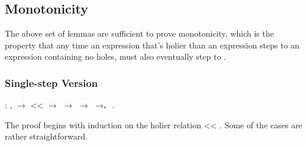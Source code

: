 \documentclass[12pt]{report}
\begin{document}
\subsection{Monotonicity}



The above set of lemmas are sufficient to prove monotonicity, which
is the property that any time an expression  that's
holier than an expression  steps to an expression
 containing no holes,  must also
eventually step to . 

\subsubsection{Single-step Version}

\begin{coqdoccode}
\coqdocemptyline
\coqdocindent{1.00em}
  : \coqdockw{\ensuremath{\forall}}   ,\coqdoceol
\coqdocindent{2.00em}
  \ensuremath{\rightarrow}\coqdoceol
\coqdocindent{2.00em}
 <<  \ensuremath{\rightarrow}\coqdoceol
\coqdocindent{2.00em}
 $\to$  \ensuremath{\rightarrow}\coqdoceol
\coqdocindent{2.00em}
 $\to_*$ .\coqdoceol
\coqdocemptyline
\end{coqdoccode}

The proof begins with induction on the holier relation 
<< . Some of the cases are rather straightforward. 
\end{document}

